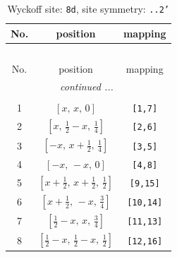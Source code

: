 \documentclass[fleqn,8pt]{jsarticle}
\begin{document}
\begin{longtable}{ccc}
\caption{Wyckoff site: {\tt 8d}, site symmetry: {\tt ..2'}}
 \\
 \hline \hline
No. & position & mapping \\ \hline \endfirsthead

\multicolumn{2}{l}{\tablename\ \thetable{}} \\
 \hline \hline
No. & position & mapping \\ \hline \endhead

 \hline \hline
\multicolumn{2}{r}{\footnotesize\it continued ...} \\ \endfoot

 \hline \hline
\multicolumn{2}{r}{} \\ \endlastfoot

1 & $\left[ x,\, x,\, 0 \right]$ & {\tt [1,7]} \\ \hline
2 & $\left[ x,\, \frac{1}{2} - x,\, \frac{1}{4} \right]$ & {\tt [2,6]} \\ \hline
3 & $\left[ - x,\, x + \frac{1}{2},\, \frac{1}{4} \right]$ & {\tt [3,5]} \\ \hline
4 & $\left[ - x,\, - x,\, 0 \right]$ & {\tt [4,8]} \\ \hline
5 & $\left[ x + \frac{1}{2},\, x + \frac{1}{2},\, \frac{1}{2} \right]$ & {\tt [9,15]} \\ \hline
6 & $\left[ x + \frac{1}{2},\, - x,\, \frac{3}{4} \right]$ & {\tt [10,14]} \\ \hline
7 & $\left[ \frac{1}{2} - x,\, x,\, \frac{3}{4} \right]$ & {\tt [11,13]} \\ \hline
8 & $\left[ \frac{1}{2} - x,\, \frac{1}{2} - x,\, \frac{1}{2} \right]$ & {\tt [12,16]} \\
\end{longtable}
\renewcommand{\arraystretch}{1.2}
\end{document}
